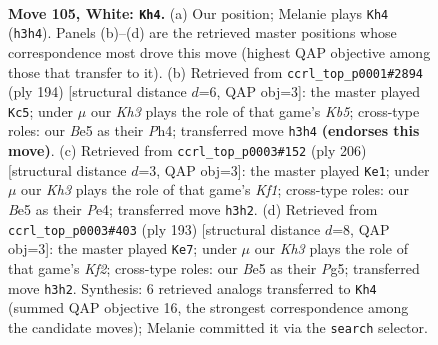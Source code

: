 \documentclass[11pt]{article}
\begin{document}
\clearpage

\begin{figure}[p]\centering
\begin{subfigure}{0.46\textwidth}\centering
\resizebox{\linewidth}{!}{%
\newchessgame
\chessboard[
  setfen={6r1/8/7k/4B3/R7/P6K/8/8 w - - 2 105},
  showmover=false,
  pgfstyle=straightmove, color=movearrow, markmove={h3-h4}
]}
\caption{}
\end{subfigure}\hfill
\begin{subfigure}{0.46\textwidth}\centering
\resizebox{\linewidth}{!}{%
\newchessgame
\chessboard[
  setfen={1R6/1P4k1/8/1K6/7P/8/1r6/8 w - - 7 98},
  showmover=false,
  pgfstyle=straightmove, color=movearrow, markmove={b5-c5}
]}
\caption{}
\end{subfigure}
\\[4pt]
\begin{subfigure}{0.46\textwidth}\centering
\resizebox{\linewidth}{!}{%
\newchessgame
\chessboard[
  setfen={8/8/8/R7/P3P3/6k1/3r4/5K2 w - - 0 104},
  showmover=false,
  pgfstyle=straightmove, color=movearrow, markmove={f1-e1}
]}
\caption{}
\end{subfigure}\hfill
\begin{subfigure}{0.46\textwidth}\centering
\resizebox{\linewidth}{!}{%
\newchessgame
\chessboard[
  setfen={8/5k2/R7/6p1/8/8/p5K1/r7 b - - 53 97},
  showmover=false,
  pgfstyle=straightmove, color=movearrow, markmove={f7-e7}
]}
\caption{}
\end{subfigure}
\caption{\textbf{Move 105, White: \texttt{Kh4}.} (a) Our position; Melanie plays \texttt{Kh4} (\texttt{h3h4}). Panels (b)--(d) are the retrieved master positions whose correspondence most drove this move (highest QAP objective among those that transfer to it). (b) Retrieved from \texttt{ccrl\_top\_p0001\#2894} (ply 194) [structural distance $d$=6, QAP obj=3]: the master played \texttt{Kc5}; under $\mu$ our \emph{Kh3} plays the role of that game's \emph{Kb5}; cross-type roles: our \emph{B}e5 as their \emph{P}h4; transferred move \texttt{h3h4} \textbf{(endorses this move)}. (c) Retrieved from \texttt{ccrl\_top\_p0003\#152} (ply 206) [structural distance $d$=3, QAP obj=3]: the master played \texttt{Ke1}; under $\mu$ our \emph{Kh3} plays the role of that game's \emph{Kf1}; cross-type roles: our \emph{B}e5 as their \emph{P}e4; transferred move \texttt{h3h2}. (d) Retrieved from \texttt{ccrl\_top\_p0003\#403} (ply 193) [structural distance $d$=8, QAP obj=3]: the master played \texttt{Ke7}; under $\mu$ our \emph{Kh3} plays the role of that game's \emph{Kf2}; cross-type roles: our \emph{B}e5 as their \emph{P}g5; transferred move \texttt{h3h2}. Synthesis: 6 retrieved analogs transferred to \texttt{Kh4} (summed QAP objective 16, the strongest correspondence among the candidate moves); Melanie committed it via the \texttt{search} selector.}
\label{fig:thought-m208}
\end{figure}
\end{document}
